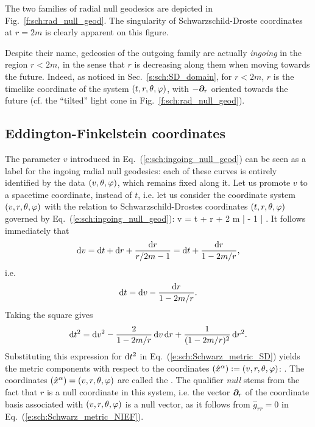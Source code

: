 The two families of radial null geodesics are depicted in
Fig.~\ref{f:sch:rad_null_geod}.
The singularity of Schwarzschild-Droste coordinates at $r=2m$
is clearly apparent on this figure.


\begin{remark}
Despite their name, gedeosics of the outgoing family are actually
\emph{ingoing} in the region $r<2m$, in the sense that
$r$ is decreasing along them when moving towards the future. Indeed,
as noticed in Sec.~\ref{s:sch:SD_domain},
for $r<2m$, $r$ is the timelike coordinate of the system $(t,r,\theta,\varphi)$,
with $-\bm{\partial}_r$ oriented towards the future (cf. the ``tilted'' light cone
in Fig.~\ref{f:sch:rad_null_geod}).
\end{remark}

\subsection{Eddington-Finkelstein coordinates}

The parameter $v$ introduced in Eq.~(\ref{e:sch:ingoing_null_geod}) can be
seen as a label for the ingoing radial null geodesics: each of these curves is
entirely identified by the data $(v,\theta,\varphi)$, which remains fixed along it.
Let us promote $v$ to a spacetime coordinate, instead of $t$, i.e. let us
consider the coordinate system $(v,r,\theta,\varphi)$ with the relation to
Schwarzschild-Drostes coordinates $(t,r,\theta,\varphi)$ governed by Eq.~(\ref{e:sch:ingoing_null_geod}):
\be \label{e:sch:v_t_r}
     v = t + r + 2 m \ln \left|  - 1 \right| .
\ee
It follows immediately that
\[
    \mathrm{d} v = \mathrm{d} t + \mathrm{d} r + \frac{\mathrm{d} r}{r/2m - 1} = \mathrm{d} t + \frac{\mathrm{d} r}{1 - 2m/r} ,
\]
i.e.
\[
    \mathrm{d} t = \mathrm{d} v -  \frac{\mathrm{d} r}{1 - 2m/r} .
\]
Taking the square gives
\[
    \mathrm{d} t^2 = \mathrm{d} v^2 - \frac{2}{1 - 2m/r} \, \mathrm{d} v \, \mathrm{d} r + \frac{1}{(1 - 2m/r)^2}\, \mathrm{d} r^2 .
\]
Substituting this expression for $\mathrm{d} t^2$ in Eq.~(\ref{e:sch:Schwarz_metric_SD})
yields the metric components with respect to the coordinates
$({\hat x}^\alpha) := (v,r,\theta,\varphi)$:
\be \label{e:sch:Schwarz_metric_NIEF}
    .
\ee
The coordinates $({\hat x}^\alpha) = (v,r,\theta,\varphi)$ are called the
. The qualifier \emph{null} stems from the fact that
$r$ is a null coordinate in this system, i.e. the vector $\bm{\partial}_r$ of the coordinate
basis associated with $(v,r,\theta,\varphi)$ is a null
vector, as it follows from ${\hat g}_{rr}=0$ in Eq.~(\ref{e:sch:Schwarz_metric_NIEF}).

